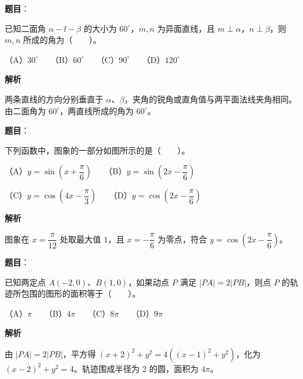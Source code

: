 \begin{answer}

\textbf{题目}：

已知二面角 $\alpha-l-\beta$ 的大小为 $60^\circ$，$m,n$ 为异面直线，且 $m\perp\alpha$，$n\perp\beta$，则 $m,n$ 所成的角为\mbox{（　　）}。

（A）$30^\circ$　　（B）$60^\circ$　　（C）$90^\circ$　　（D）$120^\circ$

\textbf{解析}

两条直线的方向分别垂直于 $\alpha\text{、}\beta$，夹角的锐角或直角值与两平面法线夹角相同。由二面角为 $60^\circ$，两直线所成的角为 $60^\circ$。


\end{answer}
\begin{answer}

\textbf{题目}：

下列函数中，图象的一部分如图所示的是\mbox{（　　）}。
\nopagebreak[4]
\begin{center}\end{center}
\nopagebreak[4]
（A）$y=\sin\left(x+\dfrac\pi6\right)$　　（B）$y=\sin\left(2x-\dfrac\pi6\right)$

（C）$y=\cos\left(4x-\dfrac\pi3\right)$　　（D）$y=\cos\left(2x-\dfrac\pi6\right)$

\textbf{解析}

图象在 $x=\dfrac\pi{12}$ 处取最大值 $1$，且 $x=-\dfrac\pi6$ 为零点，符合 $y=\cos\left(2x-\dfrac\pi6\right)$。


\end{answer}
\begin{answer}

\textbf{题目}：

已知两定点 $A(-2,0)$、$B(1,0)$，如果动点 $P$ 满足 $|PA|=2|PB|$，则点 $P$ 的轨迹所包围的图形的面积等于\mbox{（　　）}。

（A）$\pi$　　（B）$4\pi$　　（C）$8\pi$　　（D）$9\pi$

\textbf{解析}

由 $|PA|=2|PB|$，平方得 $(x+2)^2+y^2=4((x-1)^2+y^2)$，化为 $(x-2)^2+y^2=4$。轨迹围成半径为 $2$ 的圆，面积为 $4\pi$。


\end{answer}
